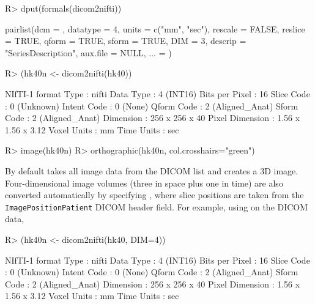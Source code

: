 \documentclass[article,nojss,shortnames]{jss}
\begin{document}
\begin{Schunk}
\begin{Sinput}
R> dput(formals(dicom2nifti))
\end{Sinput}
\begin{Soutput}
pairlist(dcm = , datatype = 4, units = c("mm", "sec"), rescale = FALSE, reslice = TRUE, qform = TRUE, sform = TRUE, DIM = 3, descrip = "SeriesDescription", aux.file = NULL, ... = )
\end{Soutput}
\begin{Sinput}
R> (hk40n <- dicom2nifti(hk40))
\end{Sinput}
\begin{Soutput}
NIfTI-1 format
  Type            : nifti
  Data Type       : 4 (INT16)
  Bits per Pixel  : 16
  Slice Code      : 0 (Unknown)
  Intent Code     : 0 (None)
  Qform Code      : 2 (Aligned_Anat)
  Sform Code      : 2 (Aligned_Anat)
  Dimension       : 256 x 256 x 40
  Pixel Dimension : 1.56 x 1.56 x 3.12
  Voxel Units     : mm
  Time Units      : sec
\end{Soutput}
\end{Schunk}
\begin{Schunk}
\begin{Sinput}
R> image(hk40n)
R> orthographic(hk40n, col.crosshairs="green")
\end{Sinput}
\end{Schunk}

By default  takes all image data from the DICOM list
and creates a 3D image.  Four-dimensional image volumes (three in
space plus one in time) are also converted automatically by specifying
, where slice positions are taken from the
\texttt{ImagePositionPatient} DICOM header field.  For example, using
 on the  DICOM data,

\begin{Schunk}
\begin{Sinput}
R> (hk40n <- dicom2nifti(hk40, DIM=4))
\end{Sinput}
\begin{Soutput}
NIfTI-1 format
  Type            : nifti
  Data Type       : 4 (INT16)
  Bits per Pixel  : 16
  Slice Code      : 0 (Unknown)
  Intent Code     : 0 (None)
  Qform Code      : 2 (Aligned_Anat)
  Sform Code      : 2 (Aligned_Anat)
  Dimension       : 256 x 256 x 40
  Pixel Dimension : 1.56 x 1.56 x 3.12
  Voxel Units     : mm
  Time Units      : sec
\end{Soutput}
\end{Schunk}
\end{document}
